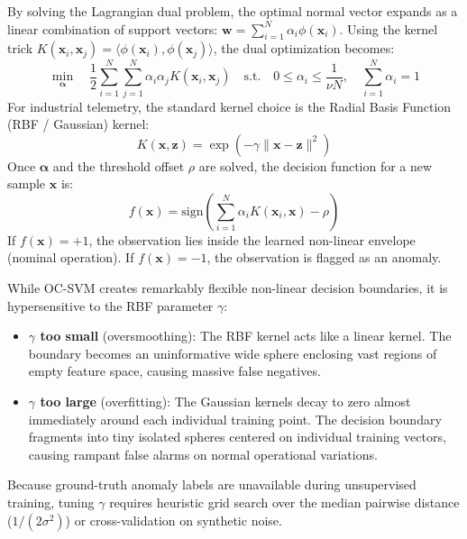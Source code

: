By solving the Lagrangian dual problem, the optimal normal vector expands as a linear combination of support vectors: $\mathbf{w} = \sum_{i=1}^N \alpha_i \phi(\mathbf{x}_i)$. Using the kernel trick $K(\mathbf{x}_i, \mathbf{x}_j) = \langle \phi(\mathbf{x}_i), \phi(\mathbf{x}_j) \rangle$, the dual optimization becomes:
\begin{equation}
\min_{\boldsymbol{\alpha}} \quad \frac{1}{2} \sum_{i=1}^N \sum_{j=1}^N \alpha_i \alpha_j K(\mathbf{x}_i, \mathbf{x}_j) \quad \text{s.t.} \quad 0 \le \alpha_i \le \frac{1}{\nu N}, \quad \sum_{i=1}^N \alpha_i = 1\label{eq:ocsvm_dual}
\end{equation}
For industrial telemetry, the standard kernel choice is the Radial Basis Function (RBF / Gaussian) kernel:
\begin{equation}
K(\mathbf{x}, \mathbf{z}) = \exp(-\gamma \|\mathbf{x} - \mathbf{z}\|^2)\label{eq:rbf_kernel_ocsvm}
\end{equation}
Once $\boldsymbol{\alpha}$ and the threshold offset $\rho$ are solved, the decision function for a new sample $\mathbf{x}$ is:
\begin{equation}
f(\mathbf{x}) = \text{sign}\left( \sum_{i=1}^N \alpha_i K(\mathbf{x}_i, \mathbf{x}) - \rho \right)\label{eq:ocsvm_decision}
\end{equation}
If $f(\mathbf{x}) = +1$, the observation lies inside the learned non-linear envelope (nominal operation). If $f(\mathbf{x}) = -1$, the observation is flagged as an anomaly.

\begin{warning}
While OC-SVM creates remarkably flexible non-linear decision boundaries, it is hypersensitive to the RBF parameter $\gamma$:
\begin{itemize}
    \item \textbf{$\gamma$ too small} (oversmoothing): The RBF kernel acts like a linear kernel. The boundary becomes an uninformative wide sphere enclosing vast regions of empty feature space, causing massive false negatives.
    \item \textbf{$\gamma$ too large} (overfitting): The Gaussian kernels decay to zero almost immediately around each individual training point. The decision boundary fragments into tiny isolated spheres centered on individual training vectors, causing rampant false alarms on normal operational variations.
\end{itemize}
Because ground-truth anomaly labels are unavailable during unsupervised training, tuning $\gamma$ requires heuristic grid search over the median pairwise distance ($1 / (2\sigma^2)$) or cross-validation on synthetic noise.
\end{warning}

